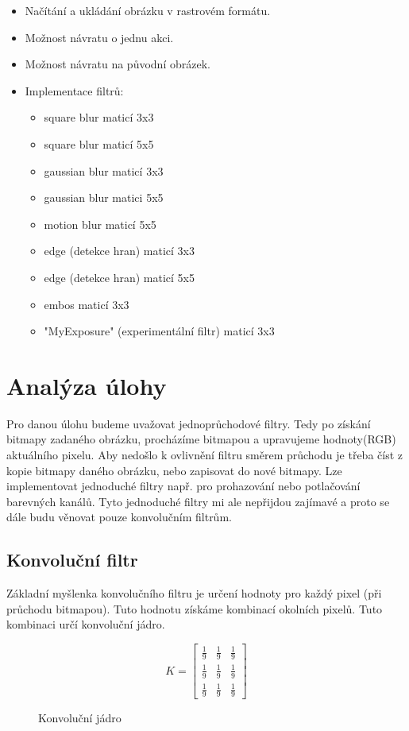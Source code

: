 \documentclass[12pt]{article}
\begin{document}
\begin{itemize}
\item Načítání a ukládání obrázku v rastrovém formátu.
\item Možnost návratu o jednu akci.
\item Možnost návratu na původní obrázek.
\item Implementace filtrů:
\begin{itemize}
\item square blur maticí 3x3
\item square blur maticí 5x5
\item gaussian blur maticí 3x3
\item gaussian blur matici 5x5
\item motion blur maticí 5x5
\item edge (detekce hran) maticí 3x3
\item edge (detekce hran) maticí 5x5
\item embos maticí 3x3
\item "MyExposure" (experimentální filtr) maticí 3x3
\end{itemize}

\end{itemize}




\section{Analýza úlohy}
Pro danou úlohu budeme uvažovat jednoprůchodové filtry. Tedy po získání bitmapy zadaného obrázku, procházíme bitmapou a upravujeme hodnoty(RGB) aktuálního pixelu. Aby nedošlo k ovlivnění filtru směrem průchodu je třeba číst z kopie bitmapy daného obrázku, nebo zapisovat do nové bitmapy. Lze implementovat jednoduché filtry např. pro prohazování nebo potlačování barevných kanálů. Tyto jednoduché filtry mi ale nepřijdou zajímavé a proto se dále budu věnovat pouze konvolučním filtrům.

\subsection{Konvoluční filtr}
Základní myšlenka konvolučního filtru je určení hodnoty pro každý pixel (při průchodu bitmapou). Tuto hodnotu získáme kombinací okolních pixelů. Tuto kombinaci určí konvoluční jádro.

\begin{figure}
\[
K=
  \begin{bmatrix}
    \frac{1}{9} & \frac{1}{9} & \frac{1}{9}\\[6pt]
    \frac{1}{9} & \frac{1}{9} & \frac{1}{9}\\[6pt]
    \frac{1}{9} & \frac{1}{9} & \frac{1}{9}
  \end{bmatrix}
\]
\caption{Konvoluční jádro}
\label{konvolucni_jadro}
\end{figure}
\end{document}
